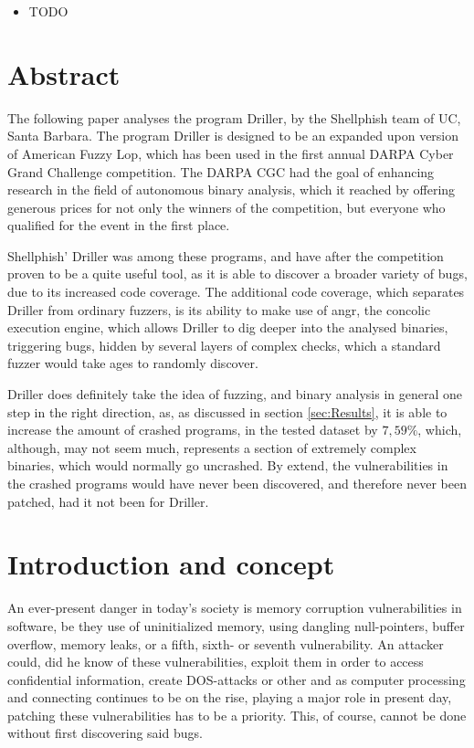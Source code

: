 \documentclass[a4paper]{article}
\begin{document}
\newpage

\begin{itemize}
	\item TODO
\end{itemize}

\newpage

\tableofcontents

\newpage
\section{Abstract}
\label{sec:Abstract}
The following paper analyses the program Driller, by the Shellphish team of UC, Santa Barbara. The program Driller is designed to be an expanded upon version of American Fuzzy Lop, which has been used in the first annual DARPA Cyber Grand Challenge competition. The DARPA CGC had the goal of enhancing research in the field of autonomous binary analysis, which it reached by offering generous prices for not only the winners of the competition, but everyone who qualified for the event in the first place.

Shellphish' Driller was among these programs, and have after the competition proven to be a quite useful tool, as it is able to discover a broader variety of bugs, due to its increased code coverage. The additional code coverage, which separates Driller from ordinary fuzzers, is its ability to make use of angr, the concolic execution engine, which allows Driller to dig deeper into the analysed binaries, triggering bugs, hidden by several layers of complex checks, which a standard fuzzer would take ages to randomly discover.

Driller does definitely take the idea of fuzzing, and binary analysis in general one step in the right direction, as, as discussed in section \ref{sec:Results}, it is able to increase the amount of crashed programs, in the tested dataset by $7,59 \%$, which, although, may not seem much, represents a section of extremely complex binaries, which would normally go uncrashed. By extend, the vulnerabilities in the crashed programs would have never been discovered, and therefore never been patched, had it not been for Driller.
\newpage
\section{Introduction and concept}
\label{sec:Intro}
An ever-present danger in today's society is memory corruption vulnerabilities in software, be they use of uninitialized memory, using dangling null-pointers, buffer overflow, memory leaks, or a fifth, sixth- or seventh vulnerability. An attacker could, did he know of these vulnerabilities, exploit them in order to access confidential information, create DOS-attacks or other and as computer processing and connecting continues to be on the rise, playing a major role in present day, patching these vulnerabilities has to be a priority. This, of course, cannot be done without first discovering said bugs. 
\end{document}

